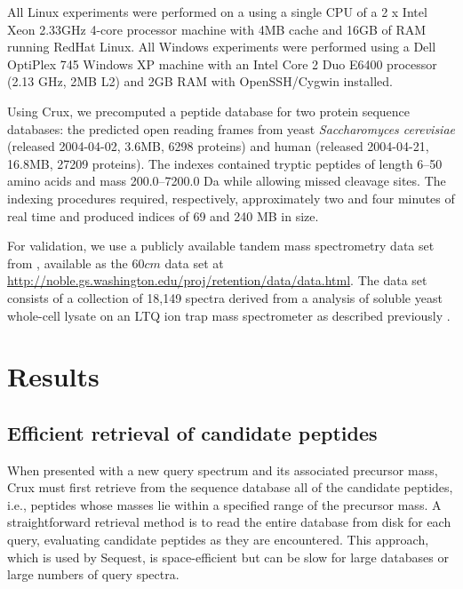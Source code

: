 \documentclass[12pt]{article}
\begin{document}
All Linux experiments were performed on a using a single CPU of a 2 x Intel
Xeon 2.33GHz 4-core processor machine with 4MB cache and 16GB of RAM
running RedHat Linux. All Windows experiments were performed using 
a Dell OptiPlex 745 Windows XP machine with an Intel Core 2 Duo E6400
processor (2.13 GHz, 2MB L2) and 2GB RAM with OpenSSH/Cygwin installed.

Using Crux, we precomputed a peptide database for two protein sequence
databases: the predicted open reading frames from yeast {\em
Saccharomyces cerevisiae} (released 2004-04-02, 3.6MB, 6298 proteins)
and human (released 2004-04-21, 16.8MB, 27209 proteins).  The indexes
contained tryptic peptides of length 6--50 amino acids and mass
200.0--7200.0 Da while allowing missed cleavage sites.  The indexing
procedures required, respectively, approximately two and four minutes
of real time and produced indices of 69 and 240 MB in size.

For validation, we use a publicly available tandem mass spectrometry
data set from \cite{klammer:improving}, available as the $60cm$ data
set at
\url{http://noble.gs.washington.edu/proj/retention/data/data.html}.
The data set consists of a collection of 18,149 spectra derived from a
analysis of soluble yeast whole-cell lysate on an LTQ ion trap mass
spectrometer as described previously \cite{klammer:improving}.

\section{Results}

\subsection{Efficient retrieval of candidate peptides}

When presented with a new query spectrum and its associated precursor
mass, Crux must first retrieve from the sequence database all of the
candidate peptides, i.e., peptides whose masses lie within a specified
range of the precursor mass.  A straightforward retrieval method is to
read the entire database from disk for each query, evaluating
candidate peptides as they are encountered.  This approach, which is
used by {\sc Sequest}, is space-efficient but can be slow for large
databases or large numbers of query spectra.
\end{document}
